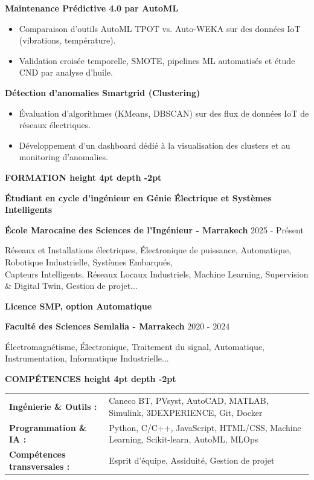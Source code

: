 \documentclass[10pt,a4paper]{altacv}
\renewcommand{\cvsection}[2][]{%
  \vspace{3pt}%
  {\color{heading}\LARGE\bfseries #2 \hspace{0.2em}\leaders\vrule height 4pt depth -2pt\hfill\mbox{}}\par\vspace{2pt}
}
\renewcommand{\cvevent}[4]{%
  {\large\bfseries\color{accent}#1\par}
  \vspace{1pt}\normalsize
  \ifstrequal{#2}{}{}{%
    \textbf{\color{emphasis}#2\ifstrequal{#4}{}{}{ - #4}}%
  }%
  \hfill
  \ifstrequal{#3}{}{}{{\small#3}}%
  \par\vspace{1pt}
}
\begin{document}
{\large\bfseries\color{accent} Maintenance Prédictive 4.0 par AutoML}\\[0.05cm]
\begin{itemize}
  \item Comparaison d'outils AutoML TPOT vs. Auto-WEKA sur des données IoT (vibrations, température).
  \item Validation croisée temporelle, SMOTE, pipelines ML automatisés et étude CND par analyse d'huile.
\end{itemize}

{\large\bfseries\color{accent} Détection d'anomalies Smartgrid (Clustering)}\\[0.05cm]
\begin{itemize}
  \item Évaluation d'algorithmes (KMeans, DBSCAN) sur des flux de données IoT de réseaux électriques.
  \item Développement d'un dashboard dédié à la visualisation des clusters et au monitoring d'anomalies.
\end{itemize}

\cvsection{FORMATION}
\cvevent{Étudiant en cycle d'ingénieur en Génie Électrique et Systèmes Intelligents}{École Marocaine des Sciences de l'Ingénieur}{2025 - Présent}{Marrakech}
\small Réseaux et Installations électriques, Électronique de puissance, Automatique, Robotique Industrielle, Systèmes Embarqués,\\
\small Capteurs Intelligents, Réseaux Locaux Industriels, Machine Learning, Supervision \& Digital Twin, Gestion de projet...

\cvevent{Licence SMP, option Automatique}{Faculté des Sciences Semlalia}{2020 - 2024}{Marrakech}
\small Électromagnétisme, Électronique, Traitement du signal, Automatique, Instrumentation, Informatique Industrielle...

\cvsection{COMPÉTENCES}
\begin{tabular}{@{}ll@{}}
\textbf{Ingénierie \& Outils :} & Caneco BT, PVsyst, AutoCAD, MATLAB, Simulink, 3DEXPERIENCE, Git, Docker \\[2pt]
\textbf{Programmation \& IA :} & Python, C/C++, JavaScript, HTML/CSS, Machine Learning, Scikit-learn, AutoML, MLOps \\[2pt]
\textbf{Compétences transversales :} & Esprit d'équipe, Assiduité, Gestion de projet \\
\end{tabular}
\end{document}
